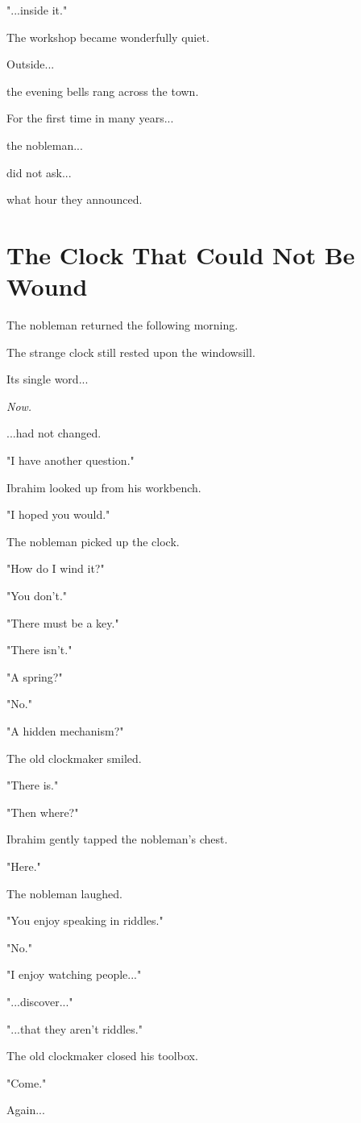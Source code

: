 \documentclass[12pt,openany]{book}
\begin{document}
"...inside it."

The workshop became wonderfully quiet.

Outside...

the evening bells rang across the town.

For the first time in many years...

the nobleman...

did not ask...

what hour they announced.
\section*{The Clock That Could Not Be Wound}

The nobleman returned the following morning.

The strange clock still rested upon the windowsill.

Its single word...

\emph{Now.}

...had not changed.

"I have another question."

Ibrahim looked up from his workbench.

"I hoped you would."

The nobleman picked up the clock.

"How do I wind it?"

"You don't."

"There must be a key."

"There isn't."

"A spring?"

"No."

"A hidden mechanism?"

The old clockmaker smiled.

"There is."

"Then where?"

Ibrahim gently tapped the nobleman's chest.

"Here."

The nobleman laughed.

"You enjoy speaking in riddles."

"No."

"I enjoy watching people..."

"...discover..."

"...that they aren't riddles."

The old clockmaker closed his toolbox.

"Come."

Again...
\end{document}

